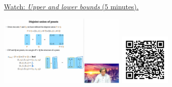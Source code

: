
\begin{minipage}{10cm}
    \href{https://act4e-spring21.netlify.app/videos/spring2021-tradeoffs:tradeoffs:orders:up-low-bounds.html}{Watch: \emph{Upper and lower bounds} (5 minutes).}
        
    \href{https://act4e-spring21.netlify.app/videos/spring2021-tradeoffs:tradeoffs:orders:up-low-bounds.html}{\includegraphics[height=3.5cm]{spring2021-tradeoffs:tradeoffs:orders:up-low-bounds/thumbnails.jpg}}
    \href{https://act4e-spring21.netlify.app/videos/spring2021-tradeoffs:tradeoffs:orders:up-low-bounds.html}{\includegraphics[height=2.5cm]{spring2021-tradeoffs:tradeoffs:orders:up-low-bounds/qrcode.png}}
\end{minipage}
